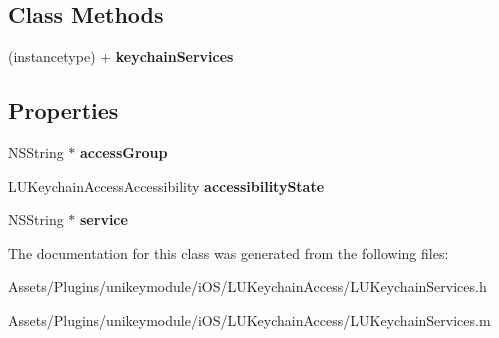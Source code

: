 \subsection*{Class Methods}
\begin{DoxyCompactItemize}
\item 
\mbox{\label{interface_l_u_keychain_services_adc4ed1267d01f65481f99afbbf2a0be1}} 
(instancetype) + {\bfseries keychain\+Services}
\end{DoxyCompactItemize}
\subsection*{Properties}
\begin{DoxyCompactItemize}
\item 
\mbox{\label{interface_l_u_keychain_services_a04052ec07298afdd22fab1827918758c}} 
N\+S\+String $\ast$ {\bfseries access\+Group}
\item 
\mbox{\label{interface_l_u_keychain_services_acd3b58dac74ff81be562b03e6cccfcf7}} 
L\+U\+Keychain\+Access\+Accessibility {\bfseries accessibility\+State}
\item 
\mbox{\label{interface_l_u_keychain_services_afd9d562afbad040bf34f14e3bda761c0}} 
N\+S\+String $\ast$ {\bfseries service}
\end{DoxyCompactItemize}


The documentation for this class was generated from the following files\+:\begin{DoxyCompactItemize}
\item 
Assets/\+Plugins/unikeymodule/i\+O\+S/\+L\+U\+Keychain\+Access/L\+U\+Keychain\+Services.\+h\item 
Assets/\+Plugins/unikeymodule/i\+O\+S/\+L\+U\+Keychain\+Access/L\+U\+Keychain\+Services.\+m\end{DoxyCompactItemize}

